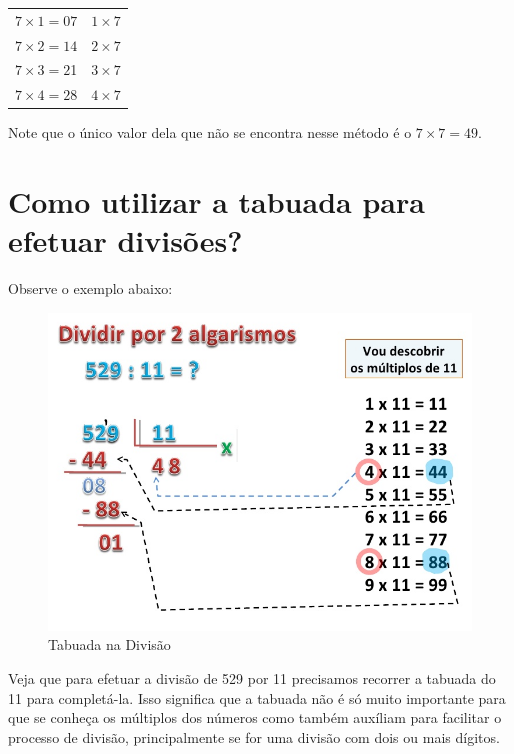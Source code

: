 \begin{center}
\begin{tabular}{c|c}
 $7\times1=07$    &  $1\times7$\\
  $7\times2=14$   &$ 2\times7$\\
 $ 7\times3=2$1 &$ 3\times7$\\
  $7\times4=28$ & $4\times7$\\
\end{tabular}
\end{center}

Note que o único valor dela que não se encontra nesse método é o $7\times7=49$.



\section{Como utilizar a tabuada para efetuar divisões?}

Observe o exemplo abaixo:
\begin{figure}[h]
   \centering
    \includegraphics[scale=.4]{./imagens/18.jpg}
    \caption{Tabuada na Divisão}
    \label{fig:my_label}
\end{figure}

Veja que para efetuar a divisão de 529 por 11 precisamos recorrer a tabuada do 11 para completá-la. Isso significa que a tabuada não é só muito importante para que se conheça os múltiplos dos números como também auxíliam para facilitar o processo de divisão, principalmente se for uma divisão com dois ou mais dígitos.


